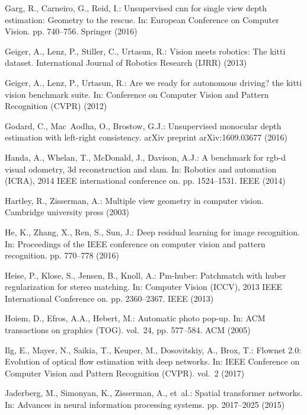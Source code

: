 \documentclass[runningheads]{llncs}
\begin{document}
\begin{thebibliography}{10}
Garg, R., Carneiro, G., Reid, I.: Unsupervised cnn for single view depth
  estimation: Geometry to the rescue. In: European Conference on Computer
  Vision. pp. 740--756. Springer (2016)

Geiger, A., Lenz, P., Stiller, C., Urtasun, R.: Vision meets robotics: The
  kitti dataset. International Journal of Robotics Research (IJRR)  (2013)

Geiger, A., Lenz, P., Urtasun, R.: Are we ready for autonomous driving? the
  kitti vision benchmark suite. In: Conference on Computer Vision and Pattern
  Recognition (CVPR) (2012)

Godard, C., Mac~Aodha, O., Brostow, G.J.: Unsupervised monocular depth
  estimation with left-right consistency. arXiv preprint arXiv:1609.03677
  (2016)

Handa, A., Whelan, T., McDonald, J., Davison, A.J.: A benchmark for rgb-d
  visual odometry, 3d reconstruction and slam. In: Robotics and automation
  (ICRA), 2014 IEEE international conference on. pp. 1524--1531. IEEE (2014)

Hartley, R., Zisserman, A.: Multiple view geometry in computer vision.
  Cambridge university press (2003)

He, K., Zhang, X., Ren, S., Sun, J.: Deep residual learning for image
  recognition. In: Proceedings of the IEEE conference on computer vision and
  pattern recognition. pp. 770--778 (2016)

Heise, P., Klose, S., Jensen, B., Knoll, A.: Pm-huber: Patchmatch with huber
  regularization for stereo matching. In: Computer Vision (ICCV), 2013 IEEE
  International Conference on. pp. 2360--2367. IEEE (2013)

Hoiem, D., Efros, A.A., Hebert, M.: Automatic photo pop-up. In: ACM
  transactions on graphics (TOG). vol.~24, pp. 577--584. ACM (2005)

Ilg, E., Mayer, N., Saikia, T., Keuper, M., Dosovitskiy, A., Brox, T.: Flownet
  2.0: Evolution of optical flow estimation with deep networks. In: IEEE
  Conference on Computer Vision and Pattern Recognition (CVPR). vol.~2 (2017)

Jaderberg, M., Simonyan, K., Zisserman, A., et~al.: Spatial transformer
  networks. In: Advances in neural information processing systems. pp.
  2017--2025 (2015)


\end{thebibliography}
\end{document}
